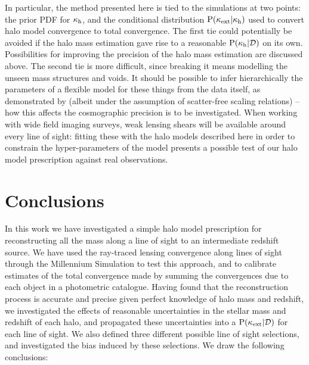 \documentclass[useAMS,usenatbib]{mn2e}
\begin{document}
In particular, the method presented here is tied to the simulations at two
points: the prior PDF for $\kappa_{\rm h}$, and the conditional distribution
${\rm P}(\kappa_{\rm ext}|\kappa_{\rm h})$ used to convert halo model convergence to total
convergence. The first tie could potentially be avoided if the halo mass
estimation gave rise to a reasonable ${\rm P}(\kappa_{\rm h}|{\mathcal{D}})$ on its own.
Possibilities for improving the precision of the halo mass estimation are
discussed above. The second tie is more difficult, since breaking it means
modelling the unseen mass structures and voids. It
should be possible to infer hierarchically  the parameters of a flexible model
for these things from the data itself, as demonstrated by
\citet{KarpenkaEtal2012} (albeit under the assumption of scatter-free scaling
relations) -- how this affects the cosmographic precision is to be
investigated. When working with wide field imaging surveys,  weak lensing shears will be
available around every line of sight:  fitting these with the halo models
described here in order to constrain the hyper-parameters of the model presents a 
possible test of our halo model prescription against real observations.



\section{Conclusions}
\label{sec:conclude}

In this work we have investigated a simple halo model prescription for
reconstructing all the mass along a line of sight to an intermediate redshift
source. We have used the ray-traced lensing convergence along lines of sight
through the Millennium Simulation to test this approach, and to calibrate
estimates of the total convergence made by summing the convergences due to
each object in a photometric catalogue. Having found that the reconstruction
process is accurate and precise given perfect knowledge of halo mass and redshift, we
investigated the effects of reasonable uncertainties in the stellar mass and
redshift of each halo, and propagated these uncertainties into a
${\rm P}(\kappa_{\rm ext}|{\mathcal{D}})$ for each line of sight. We also defined three different
possible line of sight selections, and investigated the bias induced by these
selections. We draw the following conclusions:
\end{document}
